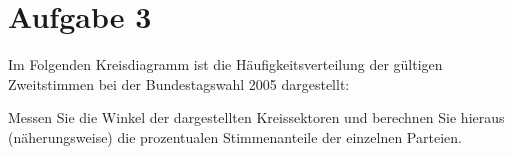 \documentclass{exercise}
\begin{document}
    \section*{Aufgabe 3}

    \begin{problem}
        Im Folgenden Kreisdiagramm ist die Häufigkeitsverteilung der gültigen Zweitstimmen bei der Bundestagswahl 2005 dargestellt:
        \begin{center}
        \end{center}
        Messen Sie die Winkel der dargestellten Kreissektoren und berechnen Sie hieraus (näherungsweise) die prozentualen Stimmenanteile der einzelnen Parteien.
    \end{problem}
    
\end{document}
